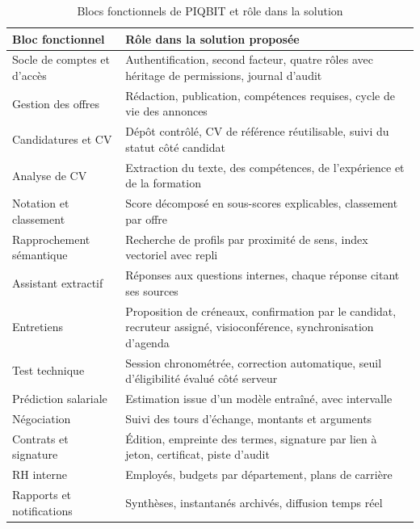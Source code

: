 \begin{table}[htbp]
  \centering
  \caption{Blocs fonctionnels de PIQBIT et rôle dans la solution}
  \label{tab:product_blocks}
  \begin{tabularx}{\textwidth}{L{4.2cm} X}
    \toprule
    \textbf{Bloc fonctionnel} & \textbf{Rôle dans la solution proposée} \\
    \midrule
    Socle de comptes et d'accès
      & Authentification, second facteur, quatre rôles avec héritage de permissions, journal d'audit \\
    Gestion des offres
      & Rédaction, publication, compétences requises, cycle de vie des annonces \\
    Candidatures et CV
      & Dépôt contrôlé, CV de référence réutilisable, suivi du statut côté candidat \\
    Analyse de CV
      & Extraction du texte, des compétences, de l'expérience et de la formation \\
    Notation et classement
      & Score décomposé en sous-scores explicables, classement par offre \\
    Rapprochement sémantique
      & Recherche de profils par proximité de sens, index vectoriel avec repli \\
    Assistant extractif
      & Réponses aux questions internes, chaque réponse citant ses sources \\
    Entretiens
      & Proposition de créneaux, confirmation par le candidat, recruteur assigné, visioconférence, synchronisation d'agenda \\
    Test technique
      & Session chronométrée, correction automatique, seuil d'éligibilité évalué côté serveur \\
    Prédiction salariale
      & Estimation issue d'un modèle entraîné, avec intervalle \\
    Négociation
      & Suivi des tours d'échange, montants et arguments \\
    Contrats et signature
      & Édition, empreinte des termes, signature par lien à jeton, certificat, piste d'audit \\
    RH interne
      & Employés, budgets par département, plans de carrière \\
    Rapports et notifications
      & Synthèses, instantanés archivés, diffusion temps réel \\
    \bottomrule
  \end{tabularx}
\end{table}

